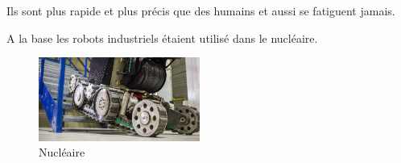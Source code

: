 \documentclass{beamer}
\begin{document}
\begin{frame}
\item Ils sont plus rapide et plus précis que des humains et aussi se fatiguent jamais. 
\item A la base les robots industriels étaient utilisé dans le nucléaire. \begin{figure}
        \centering
        \includegraphics[width=200]{img/nucl.png}
        \caption{Nucléaire}
        \label{fig:my_label}
    \end{figure}
    
\end{frame}
\end{document}
